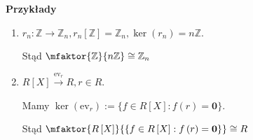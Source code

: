 \textbf{Przykłady}
\begin{enumerate}[label=\arabic*)]
	\item $r _{n} : \mathbb{Z} \to \mathbb{Z} _{n}, r _{n} \left[ \mathbb{Z}  \right] = \mathbb{Z} _{n} , \ker(r _{n} ) = n\mathbb{Z} $.

		Stąd $\mfaktor{\mathbb{Z} }{n\mathbb{Z} } \cong \mathbb{Z} _{n} $ 
	\item $R\left[ X \right] \overset{\text{ev}_{r}}{\longrightarrow} R, r\in R$.

		Mamy $\ker(\text{ev}_{r}) := \{f\in R\left[ X \right] : f\left( r \right) = \mathbf{0}\} $.

		Stąd $\mfaktor{R\left[ X \right] }{\{f\in R\left[ X \right] : f\left( r \right) = \mathbf{0}\} } \cong R$
\end{enumerate}

